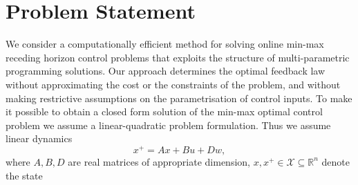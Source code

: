 \documentclass{ifacconf}
\begin{document}
\section{Problem Statement}\label{sec:problem:statement}
We consider a computationally efficient method for solving online min-max receding horizon control problems
that exploits the structure of multi-parametric programming solutions. Our approach determines the optimal
feedback law without approximating the cost or the constraints of the problem, and without making restrictive
assumptions on the parametrisation of control inputs.
%
%
To make it possible to obtain a closed form solution of the min-max optimal control problem we assume a
linear-quadratic problem formulation. Thus we assume linear dynamics 
\begin{equation}\label{eq:system:equation}
	x^+ = A x + B u + D w,
\end{equation}
%
where $A,B,D$ are real matrices of appropriate dimension, $x,  x^+\in\mathcal X\subseteq\mathbb R^n$ denote the state 
\end{document}
